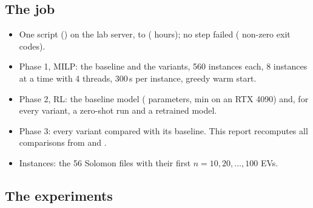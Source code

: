 \subsection{The job}\label{sec:job}
\begin{itemize}
  \item One script () on the lab server, \JobStart{} to \JobEnd{} (\JobHours{} hours); no step failed (\JobNonZero{} non-zero exit codes).
  \item Phase 1, MILP: the baseline and the \NVariants{} variants, 560 instances each, 8 instances at a time with 4 threads, 300\,s per instance, greedy warm start.
  \item Phase 2, RL: the baseline model (\RlParams{} parameters, \RlTrainMin{} min on an RTX 4090) and, for every variant, a zero-shot run and a retrained model.
  \item Phase 3: every variant compared with its baseline. This report recomputes all comparisons from  and .
  \item Instances: the 56 Solomon files with their first $n=10,20,\dots,100$ EVs.
\end{itemize}

\subsection{The experiments}



